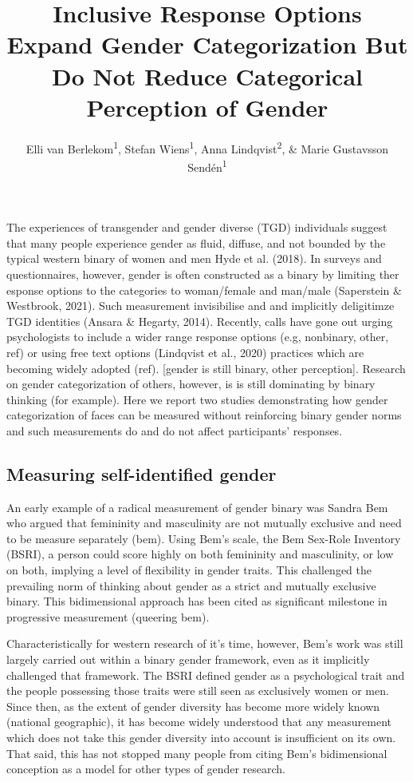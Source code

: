\documentclass[
  man]{apa7}
\title{Inclusive Response Options Expand Gender Categorization But Do Not Reduce Categorical Perception of Gender}
\author{Elli van Berlekom\textsuperscript{1}, Stefan Wiens\textsuperscript{1}, Anna Lindqvist\textsuperscript{2}, \& Marie Gustavsson Sendén\textsuperscript{1}}
\date{}
\affiliation{\vspace{0.5cm}\textsuperscript{1} Stockholm University\\\textsuperscript{2} Lund University}
\begin{document}
\maketitle

The experiences of transgender and gender diverse (TGD) individuals suggest that many people experience gender as fluid, diffuse, and not bounded by the typical western binary of women and men Hyde et al. (2018). In surveys and questionnaires, however, gender is often constructed as a binary by limiting ther esponse options to the categories to woman/female and man/male (Saperstein \& Westbrook, 2021). Such measurement invisibilise and and implicitly deligitimze TGD identities (Ansara \& Hegarty, 2014). Recently, calls have gone out urging psychologists to include a wider range response options (e.g, nonbinary, other, ref) or using free text options (Lindqvist et al., 2020) practices which are becoming widely adopted (ref). {[}gender is still binary, other perception{]}. Research on gender categorization of others, however, is is still dominating by binary thinking (for example). Here we report two studies demonstrating how gender categorization of faces can be measured without reinforcing binary gender norms and such measurements do and do not affect participants' responses.

\hypertarget{measuring-self-identified-gender}{%
\subsection{Measuring self-identified gender}\label{measuring-self-identified-gender}}

An early example of a radical measurement of gender binary was Sandra Bem who argued that femininity and masculinity are not mutually exclusive and need to be measure separately (bem). Using Bem's scale, the Bem Sex-Role Inventory (BSRI), a person could score highly on both femininity and masculinity, or low on both, implying a level of flexibility in gender traits. This challenged the prevailing norm of thinking about gender as a strict and mutually exclusive binary. This bidimensional approach has been cited as significant milestone in progressive measurement (queering bem).

Characteristically for western research of it's time, however, Bem's work was still largely carried out within a binary gender framework, even as it implicitly challenged that framework. The BSRI defined gender as a psychological trait and the people possessing those traits were still seen as exclusively women or men. Since then, as the extent of gender diversity has become more widely known (national geographic), it has become widely understood that any measurement which does not take this gender diversity into account is insufficient on its own. That said, this has not stopped many people from citing Bem's bidimensional conception as a model for other types of gender research.
\end{document}
